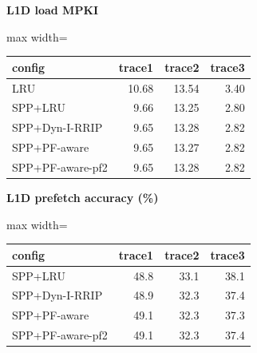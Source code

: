 \documentclass[10pt]{article}
\begin{document}
\begin{center}
\begin{minipage}[t]{0.48\linewidth}\centering
\textbf{L1D load MPKI}\\[3pt]
\begin{adjustbox}{max width=\linewidth}
\begin{tabular}{@{}lrrr@{}}
\toprule
\textbf{config} & \textbf{trace1} & \textbf{trace2} & \textbf{trace3} \\
\midrule
LRU & 10.68 & 13.54 & 3.40 \\
SPP+LRU & 9.66 & 13.25 & 2.80 \\
SPP+Dyn-I-RRIP & 9.65 & 13.28 & 2.82 \\
SPP+PF-aware & 9.65 & 13.27 & 2.82 \\
SPP+PF-aware-pf2 & 9.65 & 13.28 & 2.82 \\
\bottomrule
\end{tabular}
\end{adjustbox}
\end{minipage}\hfill
\begin{minipage}[t]{0.48\linewidth}\centering
\textbf{L1D prefetch accuracy (\%)}\\[3pt]
\begin{adjustbox}{max width=\linewidth}
\begin{tabular}{@{}lrrr@{}}
\toprule
\textbf{config} & \textbf{trace1} & \textbf{trace2} & \textbf{trace3} \\
\midrule
SPP+LRU & 48.8 & 33.1 & 38.1 \\
SPP+Dyn-I-RRIP & 48.9 & 32.3 & 37.4 \\
SPP+PF-aware & 49.1 & 32.3 & 37.3 \\
SPP+PF-aware-pf2 & 49.1 & 32.3 & 37.4 \\
\bottomrule
\end{tabular}
\end{adjustbox}
\end{minipage}
\end{center}
\medskip
\end{document}
